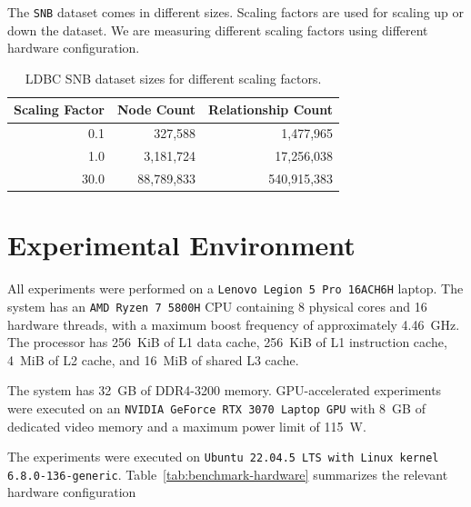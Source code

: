 \documentclass[11pt,a4paper]{article}
\begin{document}
The \texttt{SNB} dataset comes in different sizes. Scaling factors are used for scaling up or down the dataset. We are measuring different  scaling factors using different hardware configuration.
\begin{table}[htbp]
    \centering
    \caption{LDBC SNB dataset sizes for different scaling factors.}
    \label{tab:ldbc-dataset-sizes}
    \begin{tabular}{r|r|r}
        \hline
        \textbf{Scaling Factor} & \textbf{Node Count} & \textbf{Relationship Count} \\
        \hline
        0.1  & 327,588    & 1,477,965   \\
        1.0  & 3,181,724  & 17,256,038  \\
        30.0 & 88,789,833 & 540,915,383 \\
        \hline
    \end{tabular}
\end{table}

\section{Experimental Environment}
\label{sec:experimental-environment}

All experiments were performed on a \texttt{Lenovo Legion 5 Pro 16ACH6H} laptop.
The system has an \texttt{AMD Ryzen 7 5800H} CPU containing 8 physical cores and 16 hardware threads, with a maximum boost frequency of approximately 4.46~GHz. The processor has 256~KiB of L1 data cache,
256~KiB of L1 instruction cache, 4~MiB of L2 cache, and 16~MiB of shared L3 cache.

The system has 32~GB of DDR4-3200 memory. GPU-accelerated experiments were executed on an \texttt{NVIDIA GeForce
RTX 3070 Laptop GPU} with 8~GB of dedicated video memory and a maximum
power limit of 115~W.

The experiments were executed on \texttt{Ubuntu 22.04.5 LTS with Linux kernel
6.8.0-136-generic}. Table~\ref{tab:benchmark-hardware} summarizes the
relevant hardware configuration
\end{document}
